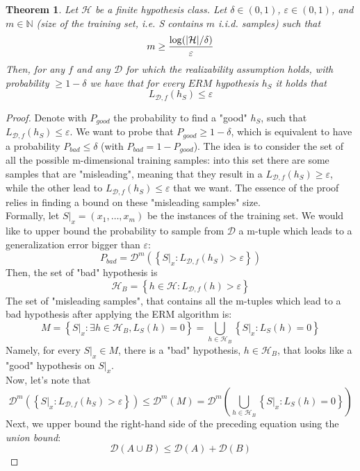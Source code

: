 \documentclass[12pt]{report}
\theoremstyle{plain}
\newtheorem{theorem}{Theorem}[chapter]
\newcommand\mcl[1]{\mathcal{#1}}
\begin{document}
\begin{flushleft}
\vspace{0.5cm}
\begin{theorem}
Let $\mcl{H}$ be a finite hypothesis class. Let $\delta\in (0,1)$, $\varepsilon\in (0,1)$, and $m\in\mathds{N}$ (size of the training set, i.e. S contains $m$ i.i.d. samples) such that
\[ m\geq\frac{\log (\abs{\mcl{H}}/\delta)}{\varepsilon} \]
Then, for any $f$ and any $\mcl{D}$ for which the realizability assumption holds, with probability $\geq 1-\delta$ we have that for every $ERM$ hypothesis $h_S$ it holds that 
\[ L_{\mcl{D},f}(h_S)\leq\varepsilon \] 
\end{theorem}
\begin{proof}
	Denote with $P_{good}$ the probability to find a "good" $h_S$, such that $L_{\mcl{D},f}(h_S)\leq\varepsilon$. We want to probe that $P_{good}\geq 1-\delta$, which is equivalent to have a probability $P_{bad}\leq\delta$ (with $P_{bad}=1-P_{good}$). The idea is to consider the set of all the possible m-dimensional training samples: into this set there are some samples that are "misleading", meaning that they result in a $L_{\mcl{D},f}(h_S)\geq\varepsilon$, while the other lead to $L_{\mcl{D},f}(h_S)\leq\varepsilon$ that we want. The essence of the proof relies in finding a bound on these "misleading samples" size.\\
	Formally, let $S|_x=(x_1,\dots,x_m)$ be the instances of the training set. We would like to upper bound the probability to sample from $\mcl{D}$ a m-tuple which leads to a generalization error bigger than $\varepsilon$:
	\[ P_{bad}=\mcl{D}^m(\left\{S|_x:L_{\mcl{D},f}(h_S)>\varepsilon\right\}) \]  
	Then, the set of "bad" hypothesis is
	\[ \mcl{H}_B=\left\{h\in\mcl{H}:L_{\mcl{D},f}(h)>\varepsilon\right\} \]
	The set of "misleading samples", that contains all the m-tuples which lead to a bad hypothesis after applying the ERM algorithm is:
	\[ M=\left\{S|_x:\exists h\in\mcl{H}_B,L_S(h)=0 \right\} = \underset{h\in\mcl{H}_B}{\bigcup}\left\{S|_x:L_S(h)=0\right\} \]
	Namely, for every $S|_x\in M$, there is a "bad" hypothesis, $h\in\mcl{H}_B$, that looks like a "good" hypothesis on $S|_x$.\\
	Now, let's note that
	\[ \mcl{D}^m\left(\left\{ S|_x:L_{\mcl{D},f}(h_S)>\varepsilon \right\}\right)\leq\mcl{D}^m(M)=\mcl{D}^m\left( \underset{h\in\mcl{H}_B}{\bigcup}\left\{S|_x:L_S(h)=0\right\} \right) \]
	Next, we upper bound the right-hand side of the preceding equation using 
	the \textit{union bound}:
	\begin{equation}
	\mcl{D}(A\cup B)\leq \mcl{D}(A)+\mcl{D}(B)
	\label{eq:union_bound}

\end{equation}
\end{proof}
\end{flushleft}
\end{document}
